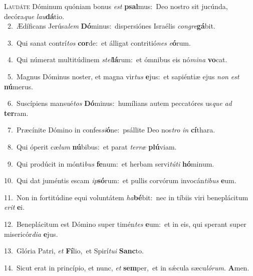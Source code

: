 \lettrine{\initial\textcolor{\initialcolor}{L}}{audáte} Dóminum quóniam bonus \textit{est} \textbf{psal}\-mus:~\star Deo nostro sit jucúnda, decóra\textit{que} \textit{lau}\-\textbf{dá}tio.\\
{\numbfont\textcolor{\numbcolor}{~2.}}~Ædíficans Jerúsa\textit{lem} \textbf{Dó}\-minus:~\star dispersiónes Israélis \textit{con}\-\textit{gre}\textbf{gá}bit.\par
{\numbfont\textcolor{\numbcolor}{~3.}}~Qui sanat contrí\textit{tos} \textbf{cor}\-de:~\star et álligat contritió\textit{nes} \textit{e}\-\textbf{ó}rum.\par
{\numbfont\textcolor{\numbcolor}{~4.}}~Qui númerat multitúdinem \textit{stel}\-\textbf{lá}rum:~\star et ómnibus eis nó\-\textit{mi}\-\textit{na} \textbf{vo}\-cat.\par
{\numbfont\textcolor{\numbcolor}{~5.}}~Magnus Dóminus noster, et magna vir\textit{tus} \textbf{e}\-jus:~\star et sapiéntiæ ejus \textit{non} \textit{est} \textbf{nú}\-merus.\par
{\numbfont\textcolor{\numbcolor}{~6.}}~Suscípiens mansué\textit{tos} \textbf{Dó}\-minus:~\star humílians autem peccatóres us\textit{que} \textit{ad} \textbf{ter}\-ram.\par
{\numbfont\textcolor{\numbcolor}{~7.}}~Præcínite Dómino in confes\-\textit{si}\-\textbf{ó}ne:~\star psállite Deo nos\textit{tro} \textit{in} \textbf{cí}\-thara.\par
{\numbfont\textcolor{\numbcolor}{~8.}}~Qui óperit cæ\textit{lum} \textbf{nú}\-bibus:~\star et parat \textit{ter}\-\textit{ræ} \textbf{plú}\-viam.\par
{\numbfont\textcolor{\numbcolor}{~9.}}~Qui prodúcit in mónti\textit{bus} \textbf{fe}\-num:~\star et herbam servi\-\textit{tú}\-\textit{ti} \textbf{hó}\-minum.\par
{\numbfont\textcolor{\numbcolor}{10.}}~Qui dat juméntis escam \textit{ip}\-\textbf{só}rum:~\star et pullis corvórum invocán\-\textit{ti}\-\textit{bus} \textbf{e}\-um.\par
{\numbfont\textcolor{\numbcolor}{11.}}~Non in fortitúdine equi voluntátem \textit{ha}\-\textbf{bé}bit:~\star nec in tíbiis viri beneplácitum \textit{e}\-\textit{rit} \textbf{e}\-i.\par
{\numbfont\textcolor{\numbcolor}{12.}}~Beneplácitum est Dómino super timén\textit{tes} \textbf{e}\-um:~\star et in eis, qui sperant super misericór\-\textit{di}\-\textit{a} \textbf{e}\-jus.\par
{\numbfont\textcolor{\numbcolor}{13.}}~Glória Patri, \textit{et} \textbf{Fí}\-lio,~\star et Spirí\-\textit{tu}\-\textit{i} \textbf{Sanc}\-to.\par
{\numbfont\textcolor{\numbcolor}{14.}}~Sicut erat in princípio, et nunc, \textit{et} \textbf{sem}\-per,~\star et in sǽcula sæcu\-\textit{ló}\-\textit{rum}. \textbf{A}\-men.\par
